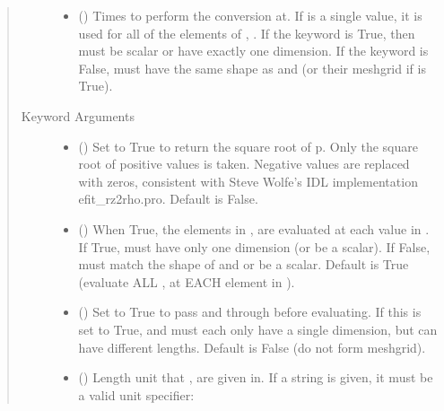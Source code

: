 \documentclass[letterpaper,10pt,english]{sphinxmanual}
\begin{document}
\begin{fulllineitems}
\begin{fulllineitems}
\begin{quote}
\begin{description}
\begin{itemize}
\item {} 
 () \textendash{} Times to perform the conversion at.
If  is a single value, it is used for all of the elements of
, . If the  keyword is True, then  must be
scalar or have exactly one dimension. If the  keyword is
False,  must have the same shape as  and  (or their
meshgrid if  is True).

\end{itemize}

\item[{Keyword Arguments}] \leavevmode\begin{itemize}
\item {} 
 () \textendash{} Set to True to return the square root of p.
Only the square root of positive values is taken. Negative
values are replaced with zeros, consistent with Steve Wolfe’s
IDL implementation efit\_rz2rho.pro. Default is False.

\item {} 
 () \textendash{} When True, the elements in ,  are evaluated
at each value in . If True,  must have only one dimension
(or be a scalar). If False,  must match the shape of  and
 or be a scalar. Default is True (evaluate ALL ,  at
EACH element in ).

\item {} 
 () \textendash{} Set to True to pass  and  through
 before evaluating. If this is set to
True,  and  must each only have a single dimension, but
can have different lengths. Default is False (do not form
meshgrid).

\item {} 
 () \textendash{} 
Length unit that ,  are given in.
If a string is given, it must be a valid unit specifier:
\begin{quote}



\end{quote}
\end{itemize}
\end{description}
\end{quote}
\end{fulllineitems}
\end{fulllineitems}
\end{document}
